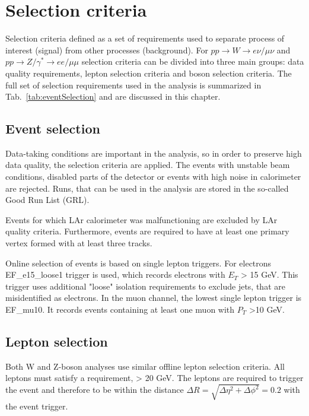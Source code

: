 \chapter{Selection criteria}\label{chap:EventSelection}

Selection criteria defined as a set of requirements used to  separate process of interest (signal) from other processes (background). For $pp \to W \to e\nu/\mu\nu$ and $pp \to Z/\gamma^* \to ee/\mu\mu$ selection criteria can be divided into three main groups: data quality requirements, lepton selection criteria and boson selection criteria. The full set of selection requirements used in the analysis is summarized in Tab.~\ref{tab:eventSelection} and are discussed in this chapter.
\section{Event selection}




Data-taking conditions are important in the analysis, so in order to preserve high data quality, the selection criteria are applied. The events with unstable beam conditions, disabled parts of the detector or events with high noise in calorimeter are rejected. Runs, that can be used in the analysis are stored in the so-called Good Run List (GRL).

Events for which LAr calorimeter was malfunctioning are excluded by LAr quality criteria. Furthermore, events are required to have at least one primary vertex formed with at least three tracks. 

Online selection of events is based on single lepton triggers. For electrons EF\_e15\_loose1 trigger is used, which records electrons with $E_T$ > 15 GeV. This trigger uses additional "loose" isolation requirements to exclude jets, that are misidentified as electrons. In the muon channel, the lowest single lepton trigger is EF\_mu10.  It records events containing at least one muon with $P_T$ >10 GeV.




\section{Lepton selection}

Both W and Z-boson analyses use similar offline lepton selection criteria. All leptons must satisfy a requirement, \ptl > 20 GeV. The leptons are required to trigger the event and therefore to be within the distance $\Delta R = \sqrt{\Delta\eta^2+\Delta\phi^2}=0.2$ with the event trigger.

